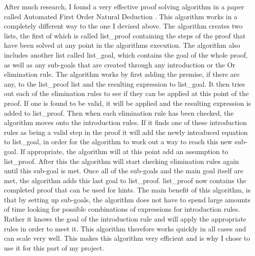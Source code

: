 After much research, I found a very effective proof solving algorithm in a paper called Automated First Order Natural Deduction \cite{ndAlgo}.  This algorithm works in a completely different way to the one I devised above. The algorithm creates two lists, the first of which is called list\_proof containing the steps of the proof that have been solved at any point in the algorithms execution. The algorithm also includes another list called list\_goal, which contains the goal of the whole proof, as well as any sub-goals that are created through any introduction or the Or elimination rule. The algorithm works by first adding the premise, if there are any, to the list\_proof list and the resulting expression to list\_goal. It then tries out each of the elimination rules to see if they can be applied at this point of the proof. If one is found to be valid, it will be applied and the resulting expression is added to list\_proof. Then when each elimination rule has been checked, the algorithm moves onto the introduction rules. If it finds one of these introduction rules as being a valid step in the proof it will add the newly introduced equation to list\_goal, in order for the algorithm to work out a way to reach this new sub-goal. If appropriate, the algorithm will at this point add an assumption to list\_proof. After this the algorithm will start checking elimination rules again until this sub-goal is met. Once all of the sub-goals and the main goal itself are met, the algorithm adds this last goal to list\_proof. list\_proof now contains the completed proof that can be used for hints. The main benefit of this algorithm, is that by setting up sub-goals, the algorithm does not have to spend large amounts of time looking for possible combinations of expressions for introduction rules. Rather it knows the goal of the introduction rule and will apply the appropriate rules in order to meet it. This algorithm therefore works quickly in all cases and can scale very well. This makes this algorithm very efficient and is why I chose to use it for this part of my project. 

